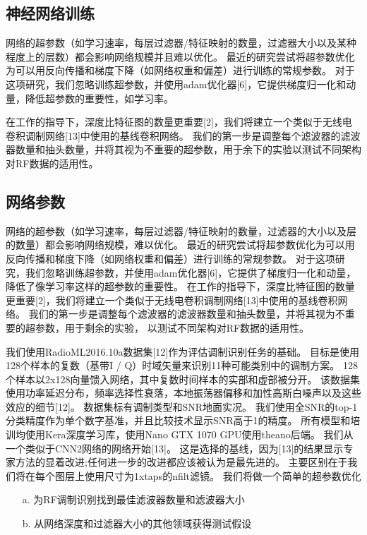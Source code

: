 \subsection{神经网络训练}

网络的超参数（如学习速率，每层过滤器/特征映射的数量，过滤器大小以及某种程度上的层数）都会影响网络规模并且难以优化。 最近的研究尝试将超参数优化为可以用反向传播和梯度下降（如网络权重和偏差）进行训练的常规参数。 对于这项研究，我们忽略训练超参数，并使用adam优化器[6]，它提供梯度归一化和动量，降低超参数的重要性，如学习率。

在工作的指导下，深度比特征图的数量更重要[2]，我们将建立一个类似于无线电卷积调制网络[13]中使用的基线卷积网络。 我们的第一步是调整每个滤波器的滤波器数量和抽头数量，并将其视为不重要的超参数，用于余下的实验以测试不同架构对RF数据的适用性。


\subsection{网络参数}

网络的超参数（如学习速率，每层过滤器/特征映射的数量，过滤器的大小以及层的数量）都会影响网络规模，难以优化。
最近的研究尝试将超参数优化为可以用反向传播和梯度下降（如网络权重和偏差）进行训练的常规参数。
对于这项研究，我们忽略训练超参数，并使用adam优化器[6]，它提供了梯度归一化和动量，降低了像学习率这样的超参数的重要性。
在工作的指导下，深度比特征图的数量更重要[2]，我们将建立一个类似于无线电卷积调制网络[13]中使用的基线卷积网络。
我们的第一步是调整每个滤波器的滤波器数量和抽头数量，并将其视为不重要的超参数，用于剩余的实验，
以测试不同架构对RF数据的适用性。\par

我们使用RadioML2016.10a数据集[12]作为评估调制识别任务的基础。
目标是使用128个样本的复数（基带I / Q）时域矢量来识别11种可能类别中的调制方案。 
128个样本以2x128向量馈入网络，其中复数时间样本的实部和虚部被分开。
该数据集使用功率延迟分布，频率选择性衰落，本地振荡器偏移和加性高斯白噪声以及这些效应的细节[12]。
数据集标有调制类型和SNR地面实况。
我们使用全SNR的top-1分类精度作为单个数字基准，并且比较技术显示SNR高于1的精度。
所有模型和培训均使用Kera深度学习库，使用Nano GTX 1070 GPU使用theano后端。
我们从一个类似于CNN2网络的网络开始[13]。
这是选择的基线，因为[13]的结果显示专家方法的显着改进;任何进一步的改进都应该被认为是最先进的。
主要区别在于我们将在每个图层上使用尺寸为1xtaps的nfilt滤镜。
我们将做一个简单的超参数优化\par

\begin{enumerate}
	\item[a.] 为RF调制识别找到最佳滤波器数量和滤波器大小
	\item[b.] 从网络深度和过滤器大小的其他领域获得测试假设
\end{enumerate}


